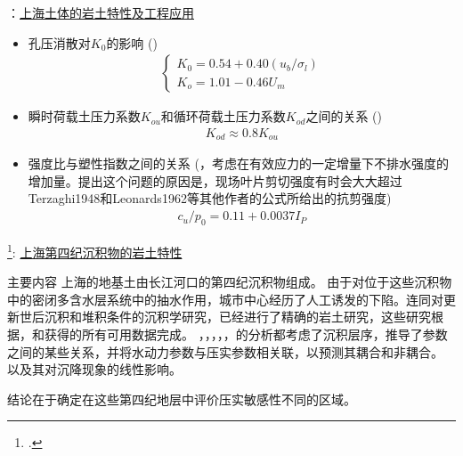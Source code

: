 \begin{frame}{\citet{Gao1986}：\href{run:./papers/Gao1986-Geotechnical properties of Shanghai soils and engineering applications.pdf}{上海土体的岩土特性及工程应用}}
    \begin{itemize}
        \item 孔压消散对$K_0$的影响 () 
        \begin{align}
            \begin{cases}
                K_0=0.54+0.40(u_b/\sigma_l) \\
                K_o=1.01-0.46U_m
            \end{cases}
        \end{align}
        \item 瞬时荷载土压力系数$K_{ou}$和循环荷载土压力系数$K_{od}$之间的关系 () 
        \begin{align}
            K_{od}\approx 0.8K_{ou}
        \end{align}
        \item 强度比与塑性指数之间的关系 (，考虑在有效应力的一定增量下不排水强度的增加量。提出这个问题的原因是，现场叶片剪切强度有时会大大超过{Terzaghi1948}和{Leonards1962}等其他作者的公式所给出的抗剪强度) 
        \begin{align}
            c_u/p_0=0.11+0.0037I_P
        \end{align}
    \end{itemize}
    
\end{frame}

\begin{frame}{\footcite{Dassargues1991}: \href{run:./papers/Dassargues1991-Geotechnical properties of the Quaternary sediments in Shanghai.pdf}{上海第四纪沉积物的岩土特性}}
    \begin{block}{主要内容}
        上海的地基土由长江河口的第四纪沉积物组成。 由于对位于这些沉积物中的密闭多含水层系统中的抽水作用，城市中心经历了人工诱发的下陷。连同对更新世后沉积和堆积条件的沉积学研究，已经进行了精确的岩土研究，这些研究根据，和获得的所有可用数据完成。 ，，，，，的分析都考虑了沉积层序，推导了参数之间的某些关系，并将水动力参数与压实参数相关联，以预测其耦合和非耦合。 以及其对沉降现象的线性影响。
   
        \vspace{5mm}
        结论在于确定在这些第四纪地层中评价压实敏感性不同的区域。
    \end{block}
\end{frame}

